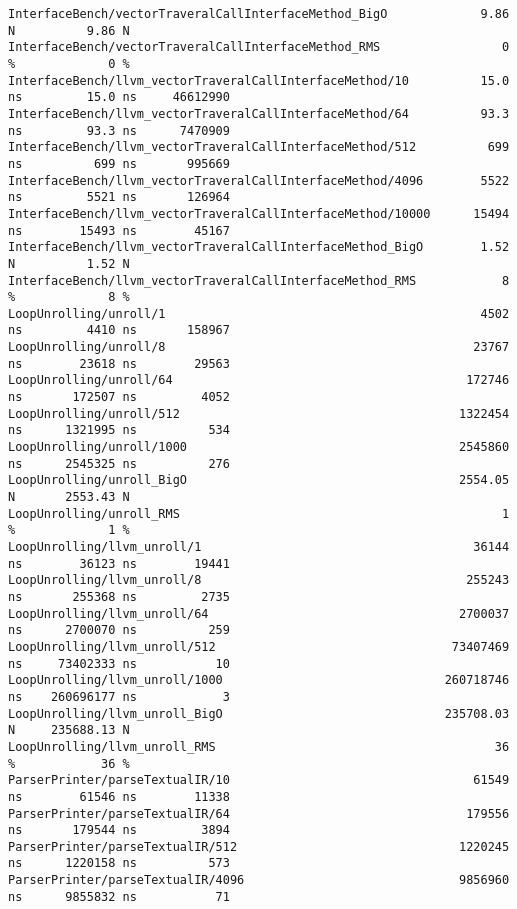 \begin{code}
\begin{verbatim}
InterfaceBench/vectorTraveralCallInterfaceMethod_BigO             9.86 N          9.86 N
InterfaceBench/vectorTraveralCallInterfaceMethod_RMS                 0 %             0 %
InterfaceBench/llvm_vectorTraveralCallInterfaceMethod/10          15.0 ns         15.0 ns     46612990
InterfaceBench/llvm_vectorTraveralCallInterfaceMethod/64          93.3 ns         93.3 ns      7470909
InterfaceBench/llvm_vectorTraveralCallInterfaceMethod/512          699 ns          699 ns       995669
InterfaceBench/llvm_vectorTraveralCallInterfaceMethod/4096        5522 ns         5521 ns       126964
InterfaceBench/llvm_vectorTraveralCallInterfaceMethod/10000      15494 ns        15493 ns        45167
InterfaceBench/llvm_vectorTraveralCallInterfaceMethod_BigO        1.52 N          1.52 N
InterfaceBench/llvm_vectorTraveralCallInterfaceMethod_RMS            8 %             8 %
LoopUnrolling/unroll/1                                            4502 ns         4410 ns       158967
LoopUnrolling/unroll/8                                           23767 ns        23618 ns        29563
LoopUnrolling/unroll/64                                         172746 ns       172507 ns         4052
LoopUnrolling/unroll/512                                       1322454 ns      1321995 ns          534
LoopUnrolling/unroll/1000                                      2545860 ns      2545325 ns          276
LoopUnrolling/unroll_BigO                                      2554.05 N       2553.43 N
LoopUnrolling/unroll_RMS                                             1 %             1 %
LoopUnrolling/llvm_unroll/1                                      36144 ns        36123 ns        19441
LoopUnrolling/llvm_unroll/8                                     255243 ns       255368 ns         2735
LoopUnrolling/llvm_unroll/64                                   2700037 ns      2700070 ns          259
LoopUnrolling/llvm_unroll/512                                 73407469 ns     73402333 ns           10
LoopUnrolling/llvm_unroll/1000                               260718746 ns    260696177 ns            3
LoopUnrolling/llvm_unroll_BigO                               235708.03 N     235688.13 N
LoopUnrolling/llvm_unroll_RMS                                       36 %            36 %
ParserPrinter/parseTextualIR/10                                  61549 ns        61546 ns        11338
ParserPrinter/parseTextualIR/64                                 179556 ns       179544 ns         3894
ParserPrinter/parseTextualIR/512                               1220245 ns      1220158 ns          573
ParserPrinter/parseTextualIR/4096                              9856960 ns      9855832 ns           71

\end{verbatim}
\end{code}
